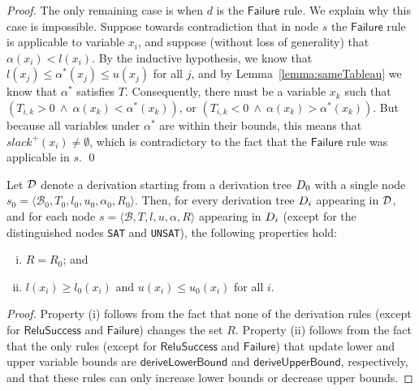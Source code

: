 \documentclass[a4paper]{llncs}
\newcommand{\basic}{\mathcal{B}}
\newcommand{\ub}{u}
\newcommand{\lb}{l}
\newcommand{\reluSet}{R}
\newcommand{\assignment}{\alpha{}}
\newcommand{\sat}{\texttt{SAT}}
\newcommand{\unsat}{\texttt{UNSAT}}
\newcommand{\rulename}[1]{\ensuremath{\mathsf{#1}}\xspace}
\newcommand{\failure}{\rulename{Failure}}
\newcommand{\reluSuccess}{\rulename{ReluSuccess}}
\newcommand{\learnUB}{\rulename{deriveUpperBound}}
\newcommand{\learnLB}{\rulename{deriveLowerBound}}
\begin{document}
\begin{proof}
The only remaining case is when $d$ is the \failure{} rule. We explain why
this case is impossible. Suppose towards contradiction that in node
$s$ the \failure{} rule is applicable to variable $x_i$, and suppose
(without loss of generality) that $\assignment(x_i) < \lb(x_i)$.
By the inductive hypothesis, we know that 
$\lb(x_j)\leq\assignment^*(x_j)\leq\ub(x_j)$ for all $j$, and by
Lemma~\ref{lemma:sameTableau} we know that $\assignment^*$ satisfies $T$.
Consequently, there must be a variable $x_k$ such that 
$(T_{i,k}>0\ \wedge\ \assignment(x_k)<\assignment^*(x_k))$, 
or
$(T_{i,k}<0\ \wedge\ \assignment(x_k)>\assignment^*(x_k))$. But because all
variables under $\assignment^*$ are within their bounds, this means that
$slack^+(x_i)\neq\emptyset$, which is contradictory to the fact that
the \failure{} rule was applicable in $s$.
\qed
\end{proof}


\begin{lemma}
\label{lemma:boundsAndRelus}
\sloppy
Let $\mathcal{D}$ denote a derivation starting from a derivation tree $D_0$ with a single node 
$s_0 = \langle \basic_0, T_0, \lb_0, \ub_0, \assignment_0, \reluSet_0 \rangle$.
Then, for every derivation tree $D_i$ appearing in $\mathcal{D}$,
and for each node $s = \langle \basic, T, \lb, \ub, \assignment, \reluSet\rangle$
appearing in $D_i$ (except for the distinguished nodes \sat{} and
\unsat{}), the following properties hold:
\begin{enumerate}[(i)]
\item $\reluSet = \reluSet_0$; and
\item $\lb(x_i)\geq \lb_0(x_i)$ and 
$\ub(x_i)\leq \ub_0(x_i)$ for all $i$.
\end{enumerate}
\end{lemma}
\begin{proof}
Property (i) follows from the fact that none of the derivation rules
(except for \reluSuccess{} and \failure{}) changes the set
$R$. Property (ii) follows from the fact that the only rules 
(except for \reluSuccess{} and \failure{})
that update lower and upper variable bounds are \learnLB{} and
\learnUB{}, respectively, and that these rules can only increase lower
bounds or decrease upper bounds.
\end{proof}
\end{document}
